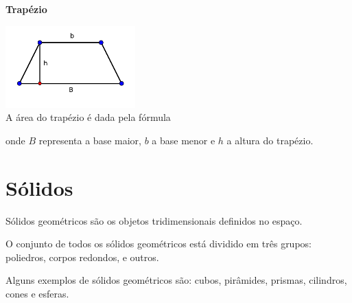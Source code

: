 \textbf{Trapézio}
\begin{multicols}{2}
\includegraphics[width=5cm]{./cap_geometria/figs/trapezioL} \\
A área do trapézio é dada pela fórmula


onde $B$ representa a base maior, $b$ a base menor e $h$ a altura do trapézio.
\end{multicols}

\section{Sólidos}


\begin{obs}
  Sólidos geométricos são os objetos tridimensionais definidos no espaço.

  O conjunto de todos os sólidos geométricos está dividido em três grupos: poliedros, corpos redondos, e outros.
\end{obs}

 Alguns exemplos de sólidos geométricos são: cubos, pirâmides, prismas, cilindros, cones e esferas.



\begin{figure}[H]
\center
{}
\qquad
{}
\end{figure}

